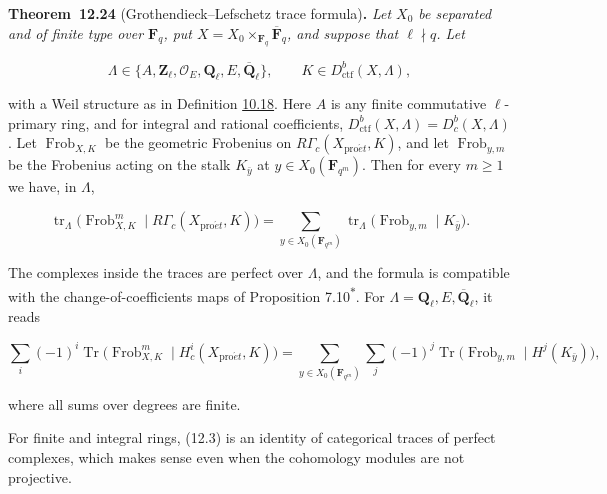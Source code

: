 \documentclass[11pt]{article}
\newenvironment{bpstatement}[2]{\par\addvspace{0.6\baselineskip}\noindent\textbf{#1}#2\textbf{.}\enspace\ignorespaces}
  {\par\addvspace{0.4\baselineskip}}
\newenvironment{bpstatementit}[2]{\begin{bpstatement}{#1}{#2}\itshape\ignorespaces}{\end{bpstatement}}
\newcommand{\bpout}[1]{#1\textsuperscript{\hyperlink{bp-outside}{\ensuremath{\ast}}}}
\providecommand{\Dbc}{}\renewcommand{\Dbc}{D^b_c}
\begin{document}
\label{bp298}%
\begin{bpstatementit}{Theorem~12.24}{ (Grothendieck–Lefschetz trace formula)}
Let \(X_0\) be separated and of finite type over \(\mathbf F_q\), put \(X=X_0\times_{\mathbf F_q}\overline{\mathbf F}_q\), and suppose that \(\ell\nmid q\). Let

\[
\Lambda\in\{A,\mathbf Z_\ell,\mathcal O_E,\mathbf Q_\ell,E,\overline{\mathbf Q}_\ell\},
\qquad K\in D^b_{\mathrm{ctf}}(X,\Lambda),
\]

with a Weil structure as in Definition \hyperref[bp156]{10.18}. Here \(A\) is any finite commutative \(\ell\)-primary ring, and for integral and rational coefficients, \(D^b_{\mathrm{ctf}}(X,\Lambda)=\Dbc(X,\Lambda)\). Let \(\operatorname{Frob}_{X,K}\) be the geometric Frobenius on \(R\Gamma_c(X_{\mathrm{pro}\acute{e}t},K)\), and let \(\operatorname{Frob}_{y,m}\) be the Frobenius acting on the stalk \(K_{\bar y}\) at \(y\in X_0(\mathbf F_{q^m})\). Then for every \(m\geq1\) we have, in \(\Lambda\),

\[
\operatorname{tr}_{\Lambda}
\bigl(\operatorname{Frob}_{X,K}^m\mid R\Gamma_c(X_{\mathrm{pro}\acute{e}t},K)\bigr)
=\sum_{y\in X_0(\mathbf F_{q^m})}
\operatorname{tr}_{\Lambda}
\bigl(\operatorname{Frob}_{y,m}\mid K_{\bar y}\bigr).
\tag{12.3}
\]

The complexes inside the traces are perfect over \(\Lambda\), and the formula is compatible with the change-of-coefficients maps of Proposition \bpout{7.10}. For \(\Lambda=\mathbf Q_\ell,E,\overline{\mathbf Q}_\ell\), it reads

\[
\sum_i(-1)^i\operatorname{Tr}
\bigl(\operatorname{Frob}_{X,K}^m\mid H_c^i(X_{\mathrm{pro}\acute{e}t},K)\bigr)
=\sum_{y\in X_0(\mathbf F_{q^m})}\sum_j(-1)^j
\operatorname{Tr}\bigl(\operatorname{Frob}_{y,m}\mid H^j(K_{\bar y})\bigr),
\tag{12.4}
\]

where all sums over degrees are finite.
\end{bpstatementit}

\label{bp299}%
For finite and integral rings, (12.3) is an identity of categorical traces of perfect complexes, which makes sense even when the cohomology modules are not projective.
\end{document}

